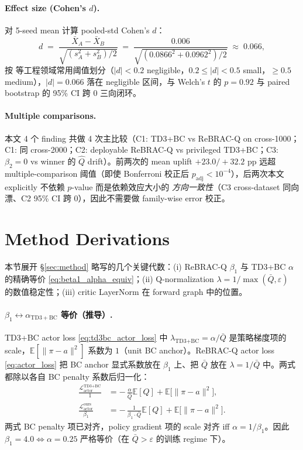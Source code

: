 \paragraph{Effect size (Cohen's $d$).}\quad
对 5-seed mean 计算 pooled-std Cohen's $d$：
\begin{equation}
d \;=\; \frac{\bar{X}_A - \bar{X}_B}{\sqrt{(s_A^2 + s_B^2) / 2}} \;=\; \frac{0.006}{\sqrt{(0.0866^2 + 0.0962^2)/2}} \;\approx\; 0.066,
\label{eq:cohens_d}
\end{equation}
按 \citet{fujimoto2021td3bc} 等工程领域常用阈值划分（$|d| < 0.2$ negligible，$0.2 \le |d| < 0.5$ small，$\ge 0.5$ medium），$|d| = 0.066$ 落在 negligible 区间，与 Welch's $t$ 的 $p = 0.92$ 与 paired bootstrap 的 95\% CI 跨 0 三向闭环。

\paragraph{Multiple comparisons.}\quad
本文 4 个 finding 共做 4 次主比较（C1: TD3+BC vs ReBRAC-Q on cross-1000；C1: 同 cross-2000；C2: deployable ReBRAC-Q vs privileged TD3+BC；C3: $\beta_2 = 0$ vs winner 的 $\hat{Q}$ drift）。前两次的 mean uplift $+23.0/+32.2$ pp 远超 multiple-comparison 阈值（即使 Bonferroni 校正后 $p_{\text{adj}} < 10^{-4}$），后两次本文 explicitly 不依赖 $p$-value 而是依赖效应大小的 \emph{方向一致性}（C3 cross-dataset 同向漂、C2 95\% CI 跨 0），因此不需要做 family-wise error 校正。

\section{Method Derivations}\label{app:derivations}

本节展开 \S\ref{sec:method} 略写的几个关键代数：(i) ReBRAC-Q $\beta_1$ 与 TD3+BC $\alpha$ 的精确等价 \eqref{eq:beta1_alpha_equiv}；(ii) Q-normalization $\lambda = 1/\max(\bar{Q},\varepsilon)$ 的数值稳定性；(iii) critic LayerNorm 在 forward graph 中的位置。

\paragraph{$\beta_1 \leftrightarrow \alpha_{\mathrm{TD3+BC}}$ 等价（推导）.}\quad
TD3+BC actor loss \eqref{eq:td3bc_actor_loss} 中 $\lambda_{\text{TD3+BC}} = \alpha / \bar{Q}$ 是策略梯度项的 scale，$\mathbb{E}[\|\pi - a\|^2]$ 系数为 $1$（unit BC anchor）。ReBRAC-Q actor loss \eqref{eq:actor_loss} 把 BC anchor 显式系数放在 $\beta_1$ 上、把 $\bar{Q}$ 放在 $\lambda = 1/\bar{Q}$ 中。两式都除以各自 BC penalty 系数后归一化：
\begin{align}
\frac{\mathcal{L}_{\text{actor}}^{\text{TD3+BC}}}{1} &= -\,\frac{\alpha}{\bar{Q}} \mathbb{E}[Q] + \mathbb{E}\bigl[\|\pi - a\|^2\bigr], \\
\frac{\mathcal{L}_{\text{actor}}^{\text{ours}}}{\beta_1} &= -\,\frac{1}{\beta_1 \cdot \bar{Q}} \mathbb{E}[Q] + \mathbb{E}\bigl[\|\pi - a\|^2\bigr].
\end{align}
两式 BC penalty 项已对齐，policy gradient 项的 scale 对齐 iff $\alpha = 1/\beta_1$。因此 $\beta_1 = 4.0 \Leftrightarrow \alpha = 0.25$ 严格等价（在 $\bar{Q} > \varepsilon$ 的训练 regime 下）。

